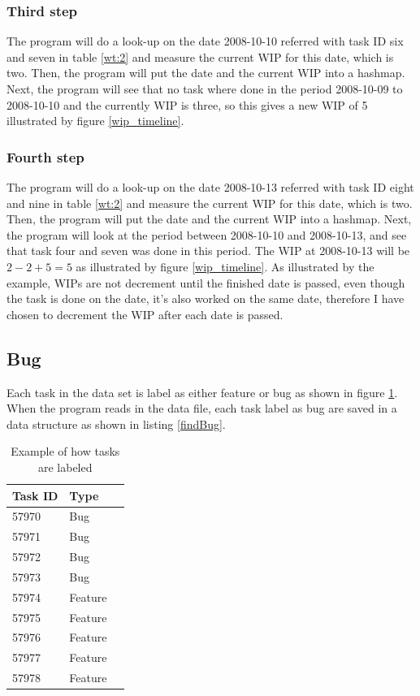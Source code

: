 \documentclass[UKenglish]{ifimaster}  %
\begin{document}
\subsubsection{Third step}
The program will do a look-up on the date 2008-10-10 referred with task ID six and seven in table \ref{wt:2}  and measure the current WIP for this date, which is two. Then, the program will put the date and the current WIP into a hashmap.
Next, the program will see that no task where done in the period 2008-10-09 to 2008-10-10 and the currently WIP is three, so this gives a new WIP of 5 illustrated by figure \ref{wip_timeline}. 

\subsubsection{Fourth step}
The program will do a look-up on the date 2008-10-13 referred with task ID eight and nine in table \ref{wt:2}  and measure the current WIP for this date, which is two. Then, the program will put the date and the current WIP into a hashmap. 
Next, the program will look at the period between 2008-10-10 and 2008-10-13, and see that task four and seven was done in this period. The WIP at 2008-10-13 will be $2-2+5 = 5$ as illustrated by figure \ref{wip_timeline}. 
As illustrated by the example, WIPs are not decrement until the finished date is passed, even though the task is done on the date, it's also worked on the same date, therefore I have chosen to decrement the WIP after each date is passed.

\subsection {Bug}
\label{Bug}
Each task in the data set is label as either feature or bug as shown in figure \ref{bugsT}. When the program reads in the data file, each task label as bug are saved in a data structure as shown in listing \ref{findBug}.

\begin{table}[ht]
\begin{center}
    \begin{tabular}{| l | l | p{5cm} |}
    \hline
    Task ID & Type \\ \hline
57970 &	Bug\\ \hline
57971&	Bug\\ \hline
57972&	Bug\\ \hline
57973&	Bug\\ \hline
57974&	Feature\\ \hline
57975&	Feature\\ \hline
57976&	Feature\\ \hline
57977&	Feature\\ \hline
57978&	Feature\\ \hline
    \end{tabular}
\caption{Example of how tasks are labeled}
\label{bugsT} %
\end{center}
\end{table}
\newpage
\end{document}
